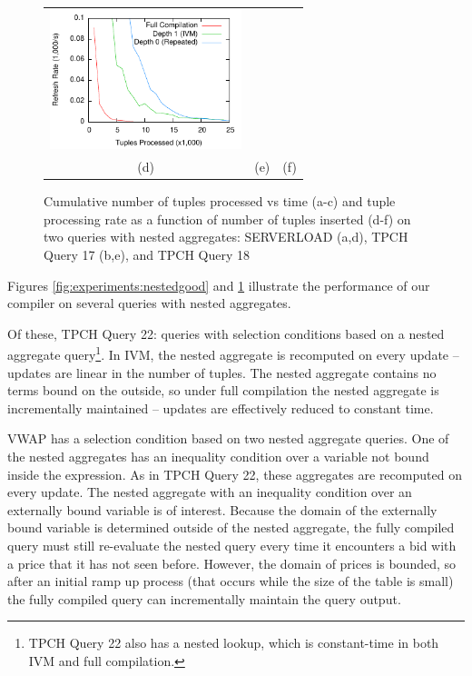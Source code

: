 \begin{figure}
\begin{center}
\begin{tabular}{ccc}
\includegraphics[width=2.2in]{../graphs/graphs/windowedrate_tpch18.pdf} \\
(d) & (e) & (f) \\
\end{tabular}
\caption{Cumulative number of tuples processed vs time (a-c) and tuple processing rate as a function of number of tuples inserted (d-f) on two queries with nested aggregates: SERVERLOAD (a,d), TPCH Query 17 (b,e), and TPCH Query 18}
\label{fig:experiments:nestedmeh}
\end{center}
\end{figure}

Figures \ref{fig:experiments:nestedgood} and \ref{fig:experiments:nestedmeh} illustrate the performance of our compiler on several queries with nested aggregates.  

Of these, TPCH Query 22: queries with selection conditions based on a nested aggregate query\footnote{TPCH Query 22 also has a nested lookup, which is constant-time in both IVM and full compilation.}.  In IVM, the nested aggregate is recomputed on every update -- updates are linear in the number of tuples.  The nested aggregate contains no terms bound on the outside, so under full compilation the nested aggregate is incrementally maintained -- updates are effectively reduced to constant time.  

VWAP has a selection condition based on two nested aggregate queries.  One of the nested aggregates has an inequality condition over a variable not bound inside the expression.  As in TPCH Query 22, these aggregates are recomputed on every update.  The nested aggregate with an inequality condition over an externally bound variable is of interest.  Because the domain of the externally bound variable is determined outside of the nested aggregate, the fully compiled query must still re-evaluate the nested query every time it encounters a bid with a price that it has not seen before.  However, the domain of prices is bounded, so after an initial ramp up process (that occurs while the size of the table is small) the fully compiled query can incrementally maintain the query output.

